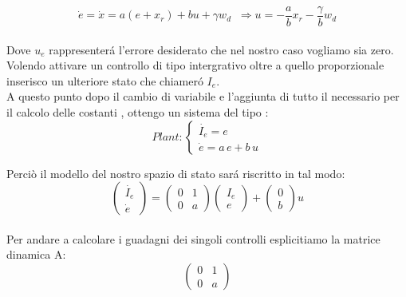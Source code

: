 \documentclass[a4paper,13pt]{article}
\begin{document}
\begin{equation*}
	\dot{e}=\dot{x}=a(e+x_{r})+bu+\gamma w_{d}\,\,\:           %
	\Rightarrow u=-\frac{a}{b} x_{r}-\frac{\gamma}{b} w_{d}
\end{equation*} \\
Dove $u_e$ rappresenter\'a l'errore desiderato che nel nostro caso vogliamo sia zero.\\
Volendo attivare un controllo di tipo intergrativo oltre a quello proporzionale
inserisco un ulteriore stato che chiamer\'o $I_e$.\\
A questo punto dopo il cambio di variabile e l'aggiunta di tutto il necessario
per il calcolo delle costanti , ottengo un sistema del tipo :
\[Plant	:
\begin{cases}
	
	\dot{I_{e}}= e \\
	\dot{e} = a\,e + b\,u
	
\end{cases}\]

Perciò il modello del nostro spazio di stato sar\'a riscritto in tal modo:
\begin{equation*}	
\begin{pmatrix}
	
	\dot{I_{e}} \\ \dot{e}
	
\end{pmatrix} =         %
\begin{pmatrix}

	0&1\\0&a

\end{pmatrix}
\begin{pmatrix}

	I_{e}\\e

\end{pmatrix} +           %
\begin{pmatrix}

	0\\b

\end{pmatrix} u
\end{equation*} \\
Per andare a calcolare i guadagni dei singoli controlli esplicitiamo la matrice dinamica A:        %
\begin{equation*}
\begin{pmatrix}

	0&1\\0&a

\end{pmatrix}
\end{equation*} \\
\end{document}
